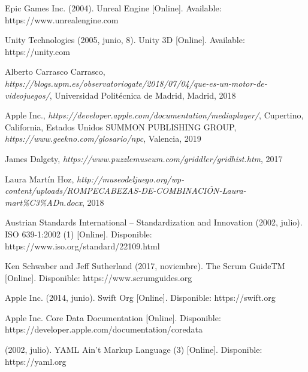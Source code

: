\begin{thebibliography}{99}
 Epic Games Inc. (2004). Unreal Engine [Online]. Available: https://www.unrealengine.com

 Unity Technologies (2005, junio, 8). Unity 3D [Online]. Available: https://unity.com

 Alberto Carrasco Carrasco, \textit{https://blogs.upm.es/observatoriogate/2018/07/04/que-es-un-motor-de-videojuegos/}, Universidad Politécnica de Madrid, Madrid, 2018

 Apple Inc., \textit{https://developer.apple.com/documentation/mediaplayer/}, Cupertino, California, Estados Unidos
 SUMMON PUBLISHING GROUP, \textit{https://www.geekno.com/glosario/npc}, Valencia, 2019

 James Dalgety, \textit{https://www.puzzlemuseum.com/griddler/gridhist.htm}, 2017

 Laura Martín Hoz, \textit{http://museodeljuego.org/wp-content/uploads/ROMPECABEZAS-DE-COMBINACIÓN-Laura-mart\%C3\%ADn.docx}, 2018

 Austrian Standards International – Standardization and Innovation (2002, julio). ISO 639-1:2002 (1) [Online]. Disponible: https://www.iso.org/standard/22109.html

 Ken Schwaber and Jeff Sutherland (2017, noviembre). The Scrum GuideTM  [Online]. Disponible: https://www.scrumguides.org

 Apple Inc. (2014, junio). Swift Org [Online]. Disponible: https://swift.org

 Apple Inc. Core Data Documentation [Online]. Disponible: https://developer.apple.com/documentation/coredata

 (2002, julio). YAML Ain’t Markup Language (3) [Online]. Disponible: https://yaml.org

\end{thebibliography}
